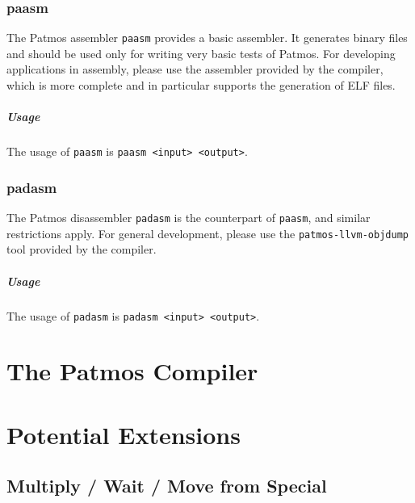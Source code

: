 \documentclass[a4paper,fontsize=10pt,twoside,DIV15,BCOR12mm,headinclude=true,footinclude=false,pagesize,bibtotoc]{scrbook}
\begin{document}
\subsection{paasm}

The Patmos assembler \texttt{paasm} provides a basic assembler. It
generates binary files and should be used only for writing very basic
tests of Patmos. For developing applications in assembly, please use
the assembler provided by the compiler, which is more complete and in
particular supports the generation of ELF files.

\paragraph{Usage}

The usage of \texttt{paasm} is \texttt{paasm <input> <output>}.

\subsection{padasm}

The Patmos disassembler \texttt{padasm} is the counterpart of
\texttt{paasm}, and similar restrictions apply. For general
development, please use the \texttt{patmos-llvm-objdump} tool provided
by the compiler.

\paragraph{Usage}

The usage of \texttt{padasm} is \texttt{padasm <input> <output>}.





\chapter{The Patmos Compiler}
\label{sec:compiler}




\chapter{Potential Extensions}

\section{Multiply / Wait / Move from Special}
\end{document}
